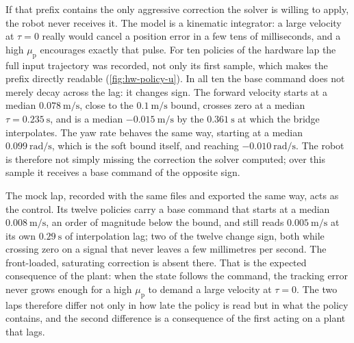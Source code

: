 If that prefix contains the only aggressive correction the solver is
willing to apply, the robot never receives it. The \ocs{} model is a
kinematic integrator: a large velocity at $\tau=0$ really would cancel a
position error in a few tens of milliseconds, and a high
$\mu_{\mathrm{p}}$ encourages exactly that pulse. For ten policies of
the hardware lap the full input trajectory was recorded, not only its
first sample, which makes the prefix directly readable
(\cref{fig:hw-policy-u}). In all ten the base command does not merely
decay across the lag: it changes sign. The forward velocity starts at a
median $\qty{0.078}{\meter\per\second}$, close to the
$\qty{0.1}{\meter\per\second}$ bound, crosses zero at a median
$\tau = \qty{0.235}{\second}$, and is a median
$\qty{-0.015}{\meter\per\second}$ by the $\qty{0.361}{\second}$ at which
the bridge interpolates. The yaw rate behaves the same way, starting at
a median $\qty{0.099}{\radian\per\second}$, which is the soft bound
itself, and reaching $\qty{-0.010}{\radian\per\second}$. The robot is
therefore not simply missing the correction the solver computed; over
this sample it receives a base command of the opposite sign.

The mock lap, recorded with the same files and exported the same way,
acts as the control. Its twelve policies carry a base command that
starts at a median $\qty{0.008}{\meter\per\second}$, an order of
magnitude below the bound, and still reads
$\qty{0.005}{\meter\per\second}$ at its own
$\qty{0.29}{\second}$ of interpolation lag; two of the twelve change
sign, both while crossing zero on a signal that never leaves a few
millimetres per second. The front-loaded, saturating correction is
absent there. That is the expected consequence of the plant: when the
state follows the command, the tracking error never grows enough for a
high $\mu_{\mathrm{p}}$ to demand a large velocity at $\tau=0$. The
two laps therefore differ not only in how late the policy is read but in
what the policy contains, and the second difference is a consequence of
the first acting on a plant that lags.

